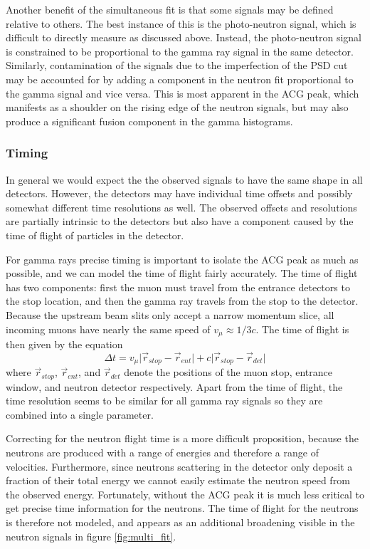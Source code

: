 Another benefit of the simultaneous fit is that some signals may be defined relative to others.  
The best instance of this is the photo-neutron signal, which is difficult to directly measure as discussed above.  
Instead, the photo-neutron signal is constrained to be proportional to the gamma ray signal in the same detector.  
Similarly, contamination of the signals due to the imperfection of the PSD cut may be accounted for by adding a component in the neutron fit proportional to the gamma signal and vice versa.
This is most apparent in the ACG peak, which manifests as a shoulder on the rising edge of the neutron signals, but may also produce a significant fusion component in the gamma histograms.

\subsubsection{Timing}

In general we would expect the the observed signals to have the same shape in all detectors.  
However, the detectors may have individual time offsets and possibly somewhat different time resolutions as well.
The observed offsets and resolutions are partially intrinsic to the detectors but also have a component caused by the time of flight of particles in the detector.

For gamma rays precise timing is important to isolate the ACG peak as much as possible, and we can model the time of flight fairly accurately.
The time of flight has two components: first the muon must travel from the entrance detectors to the stop location, and then the gamma ray travels from the stop to the detector.
Because the upstream beam slits only accept a narrow momentum slice, all incoming muons have nearly the same speed of $v_{\mu} \approx 1/3 c$. 
The time of flight is then given by the equation
\begin{equation}
\Delta t = v_{\mu} \lvert \vec{r}_{stop}-\vec{r}_{ent} \rvert + c \lvert \vec{r}_{stop}-\vec{r}_{det} \rvert
\end{equation}
where $\vec{r}_{stop}$, $\vec{r}_{ent}$, and $\vec{r}_{det}$ denote the positions of the muon stop, entrance window, and neutron detector respectively.
Apart from the time of flight, the time resolution seems to be similar for all gamma ray signals so they are combined into a single parameter.

Correcting for the neutron flight time is a more difficult proposition, because the neutrons are produced with a range of energies and therefore a range of velocities.  
Furthermore, since neutrons scattering in the detector only deposit a fraction of their total energy we cannot easily estimate the neutron speed from the observed energy.
Fortunately, without the ACG peak it is much less critical to get precise time information for the neutrons.
The time of flight for the neutrons is therefore not modeled, and appears as an additional broadening visible in the neutron signals in figure \ref{fig:multi_fit}.

